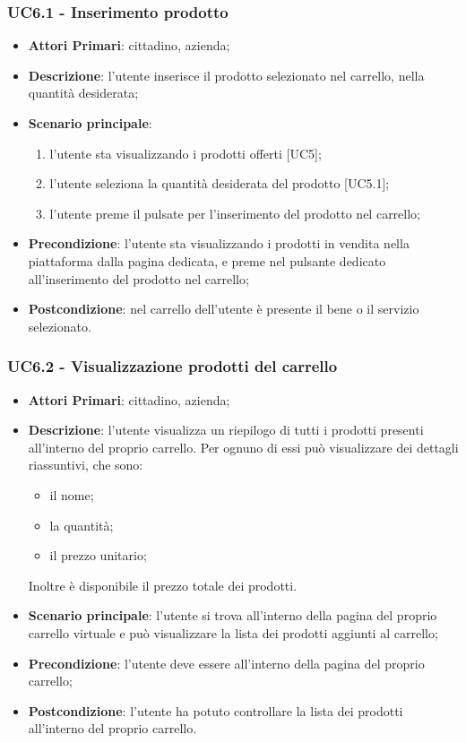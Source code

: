  \subsubsection{UC6.1 - Inserimento prodotto}
\begin{itemize}
	\item \textbf{Attori Primari}: cittadino, azienda;
	\item \textbf{Descrizione}: l'utente inserisce il prodotto selezionato nel carrello, nella quantità desiderata;
	\item \textbf{Scenario principale}:
	\begin{enumerate}[label=\alph*.]
		\item l'utente sta visualizzando i prodotti offerti [UC5];
		\item l'utente seleziona la quantità desiderata del prodotto [UC5.1];
		\item l'utente preme il pulsate per l'inserimento del prodotto nel carrello;
	\end{enumerate}
	\item \textbf{Precondizione}: l'utente sta visualizzando i prodotti in vendita nella piattaforma dalla pagina dedicata, e preme nel pulsante dedicato all'inserimento del prodotto nel carrello;
	\item \textbf{Postcondizione}: nel carrello dell'utente è presente il bene o il servizio selezionato.
\end{itemize}
\subsubsection{UC6.2 - Visualizzazione prodotti del carrello}
\begin{itemize}
	\item \textbf{Attori Primari}: cittadino, azienda;
	\item \textbf{Descrizione}: l'utente visualizza un riepilogo di tutti i prodotti presenti all'interno del proprio carrello. Per ognuno di essi può visualizzare dei dettagli riassuntivi, che sono:
	\begin{itemize}
		\item il nome;
		\item la quantità;
		\item il prezzo unitario;
	\end{itemize}
	Inoltre è disponibile il prezzo totale dei prodotti.

	\item \textbf{Scenario principale}: l'utente si trova all'interno della pagina del proprio carrello virtuale e può visualizzare la lista dei prodotti aggiunti al carrello;
	\item \textbf{Precondizione}: l'utente deve essere all'interno della pagina del proprio carrello;
	\item \textbf{Postcondizione}: l'utente ha potuto controllare la lista dei prodotti all'interno del proprio carrello.
\end{itemize}

